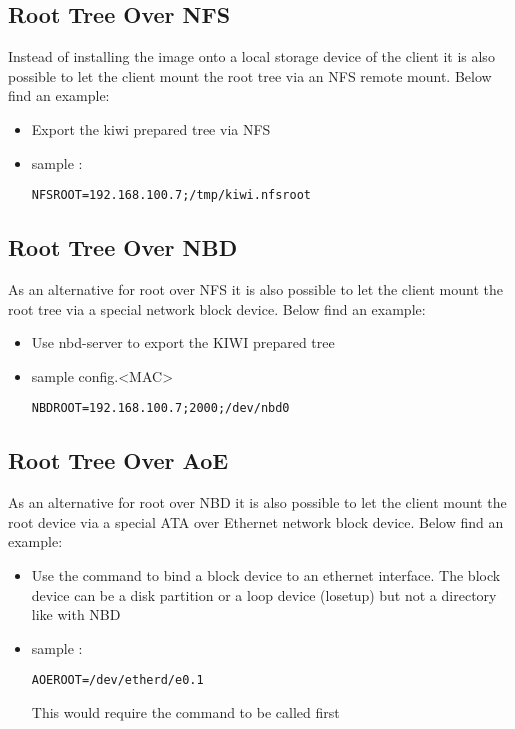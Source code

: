 \subsection{Root Tree Over NFS}
Instead of installing the image onto a local storage device of
the client it is also possible to let the client mount the root
tree via an NFS remote mount. Below find an example:

\begin{itemize}
\item Export the kiwi prepared tree via NFS
\item sample :

\begin{verbatim}
NFSROOT=192.168.100.7;/tmp/kiwi.nfsroot
\end{verbatim}
\end{itemize}

\subsection{Root Tree Over NBD}

As an alternative for root over NFS it is also possible to
let the client mount the root tree via a special network block
device. Below find an example:

\begin{itemize}
\item Use nbd-server to export the KIWI prepared tree
\item sample config.<MAC>

\begin{verbatim}
NBDROOT=192.168.100.7;2000;/dev/nbd0
\end{verbatim}
\end{itemize}

\subsection{Root Tree Over AoE}

As an alternative for root over NBD it is also possible to
let the client mount the root device via a special ATA over
Ethernet network block device. Below find an example:

\begin{itemize}
\item Use the  command to bind a block device to an
      ethernet interface. The block device can be a disk
      partition or a loop device (losetup) but not a directory 
      like with NBD
\item sample :

\begin{verbatim}
AOEROOT=/dev/etherd/e0.1
\end{verbatim}

      This would require the command
       
      to be called first
\end{itemize}

